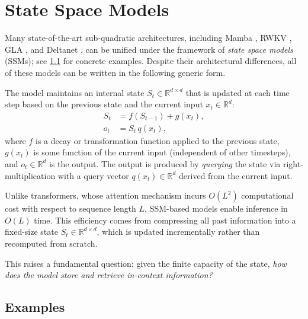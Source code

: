\documentclass[11pt]{article}
\begin{document}


\section{State Space Models}
\label{sec:ssm}

Many state-of-the-art sub-quadratic architectures, including Mamba \cite{gu2023mamba}, RWKV \cite{peng2023rwkv}, GLA \cite{yang2023gla}, and Deltanet \cite{yang2024deltanet}, can be unified under the framework of \emph{state space models} (SSMs); see \cref{sec:ssm_examples} for concrete examples. Despite their architectural differences, all of these models can be written in the following generic form.

The model maintains an internal state $S_t \in \mathbb{R}^{d \times d}$ that is updated at each time step based on the previous state and the current input $x_t \in \mathbb{R}^{d}$:
\begin{align}
    S_t &= f(S_{t-1}) + g(x_t), \label{eq:state_update} \\
    o_t &= S_t \, q(x_t), \label{eq:state_query}
\end{align}
where $f$ is a decay or transformation function applied to the previous state, $g(x_t)$ is some function of the current input (independent of other timesteps), and $o_t \in \mathbb{R}^{d}$ is the output. The output is produced by \emph{querying} the state via right-multiplication with a query vector $q(x_t) \in \mathbb{R}^{d}$ derived from the current input.

Unlike transformers, whose attention mechanism incurs $O(L^2)$ computational cost with respect to sequence length $L$, SSM-based models enable inference in $O(L)$ time. This efficiency comes from compressing all past information into a fixed-size state $S_t \in \mathbb{R}^{d \times d}$, which is updated incrementally rather than recomputed from scratch.

This raises a fundamental question: given the finite capacity of the state, \emph{how does the model store and retrieve in-context information?}

\subsection{Examples}
\label{sec:ssm_examples}
\end{document}
